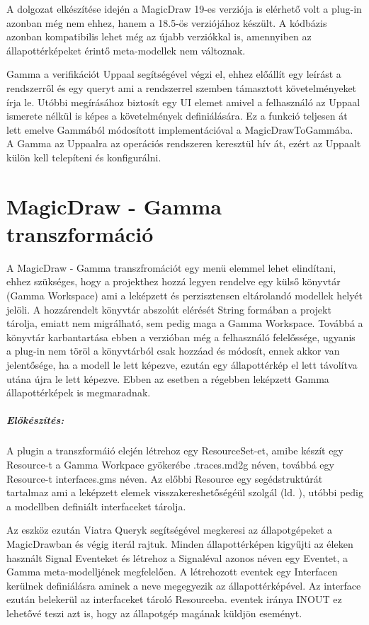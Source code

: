 A dolgozat elkészítése idején a MagicDraw 19-es verziója is elérhető volt a plug-in azonban még nem ehhez, hanem a 18.5-ös verziójához készült. A kódbázis azonban kompatibilis lehet még az újabb verziókkal is, amennyiben az állapottérképeket érintő meta-modellek nem változnak.

Gamma a verifikációt Uppaal segítségével végzi el, ehhez előállít egy leírást a rendszerről és egy queryt ami a rendszerrel szemben támasztott követelményeket írja le. Utóbbi megírásához biztosít egy UI elemet amivel a felhasználó az Uppaal ismerete nélkül is képes a követelmények definiálására. Ez a funkció teljesen át lett emelve Gammából módosított implementációval a MagicDrawToGammába. A Gamma az Uppaalra az operációs rendszeren keresztül hív át, ezért az Uppaalt külön kell telepíteni és konfigurálni.

\section{MagicDraw - Gamma transzformáció}

A MagicDraw - Gamma transzfromációt egy menü elemmel lehet elindítani, ehhez szükséges, hogy a projekthez hozzá legyen rendelve egy külső könyvtár (Gamma Workspace) ami a leképzett és perzisztensen eltárolandó modellek helyét jelöli. A hozzárendelt könyvtár abszolút elérését String formában a projekt tárolja, emiatt nem migrálható, sem pedig maga a Gamma Workspace. Továbbá a könyvtár karbantartása ebben a verzióban még a felhasználó felelőssége, ugyanis a plug-in nem töröl a könyvtárból csak hozzáad és módosít, ennek akkor van jelentősége, ha a modell le lett képezve, ezután egy állapottérkép el lett távolítva utána újra le lett képezve. Ebben az esetben a régebben leképzett Gamma állapottérképek is megmaradnak.

\subparagraph{Előkészítés:}

A plugin a transzformáió elején létrehoz egy ResourceSet-et, amibe készít egy Resource-t a Gamma Workpace gyökerébe .traces.md2g néven, továbbá egy Resource-t interfaces.gms néven. Az előbbi Resource egy segédstruktúrát tartalmaz ami a leképzett elemek visszakereshetőségéül szolgál (ld. ), utóbbi pedig a modellben definiált interfaceket tárolja.

Az eszköz ezután Viatra Queryk segítségével megkeresi az állapotgépeket a MagicDrawban és végig iterál rajtuk. Minden állapottérképen kigyűjti az éleken használt Signal Eventeket és létrehoz a Signaléval azonos néven egy Eventet, a Gamma meta-modelljének megfelelően. A létrehozott eventek egy Interfacen kerülnek definiálásra aminek a neve megegyezik az állapottérképével. Az interface ezután belekerül az interfaceket tároló Resourceba. eventek iránya INOUT ez lehetővé teszi azt is, hogy az állapotgép magának küldjön eseményt.

